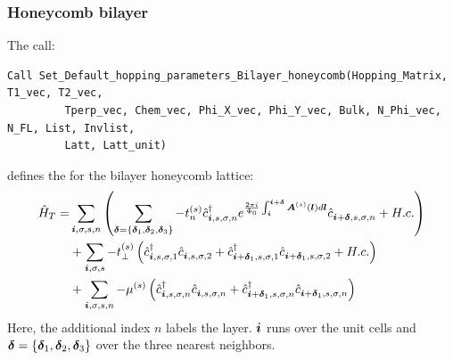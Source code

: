\subsubsection*{Honeycomb  bilayer}
The call:
 \begin{lstlisting}[style=fortran]
Call Set_Default_hopping_parameters_Bilayer_honeycomb(Hopping_Matrix, T1_vec, T2_vec,
         Tperp_vec, Chem_vec, Phi_X_vec, Phi_Y_vec, Bulk, N_Phi_vec, N_FL, List, Invlist,
         Latt, Latt_unit)
\end{lstlisting}  
defines  the   for the  bilayer  honeycomb  lattice:                 
\begin{align}
\hat{H}_T  =  &   \sum_{\boldsymbol{i}, \sigma, s,n } \left(  \sum_{ \boldsymbol{\delta} = \left\{ \boldsymbol{\delta}_1, \boldsymbol{\delta}_2, \boldsymbol{\delta}_3 \right\} }  - t_n^{(s)} \hat{c}^{\dagger}_{\boldsymbol{i},s,\sigma,n}   e^{\frac{2 \pi i}{\Phi_0} \int_{\boldsymbol{i}}^{\boldsymbol{i}+ \boldsymbol{\delta}}  \boldsymbol{A}^{(s)}(\boldsymbol{l})  d \boldsymbol{l}}   \hat{c}^{}_{\boldsymbol{i} + \boldsymbol{\delta},s,\sigma,n} +  H.c. \right)       \nonumber \\
      & +   \sum_{\boldsymbol{i}, \sigma, s } -  t_{\perp}^{(s)}  \left( \hat{c}^{\dagger}_{\boldsymbol{i},s,\sigma,1} \hat{c}^{}_{\boldsymbol{i},s,\sigma,2}   +
                   \hat{c}^{\dagger}_{\boldsymbol{i} + \boldsymbol{\delta}_1,s,\sigma,1} \hat{c}^{}_{\boldsymbol{i} + \boldsymbol{\delta}_1,s,\sigma,2}  + H.c.  \right)   \nonumber \\
      & +   \sum_{\boldsymbol{i}, \sigma, s, n }  -  \mu^{(s)}  \left(\hat{c}^{\dagger}_{\boldsymbol{i},s,\sigma,n} \hat{c}^{}_{\boldsymbol{i},s,\sigma,n}  +  \hat{c}^{\dagger}_{\boldsymbol{i} + \boldsymbol{\delta}_1,s,\sigma,n} \hat{c}^{}_{\boldsymbol{i} + \boldsymbol{\delta}_1 ,s,\sigma,n}  \right)  
\end{align}
Here, the additional  index  $n$  labels the layer.   $\boldsymbol{i} $   runs over the unit cells  and   $\boldsymbol{\delta} = \left\{ \boldsymbol{\delta}_1, \boldsymbol{\delta}_2, \boldsymbol{\delta}_3 \right\} $  over the three nearest neighbors. 


